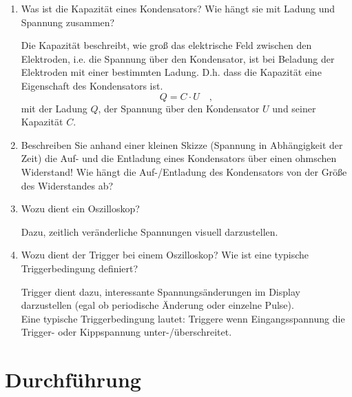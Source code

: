 \begin{enumerate}
\begin{solution}
		\end{solution}
 \item Was ist die Kapazität eines Kondensators? Wie hängt sie mit Ladung und Spannung zusammen?
		\begin{solution}
			Die Kapazität beschreibt, wie groß das elektrische Feld zwischen den Elektroden, i.e. die Spannung über den Kondensator, ist bei Beladung der Elektroden mit einer bestimmten Ladung. D.h. dass die Kapazität eine Eigenschaft des Kondensators ist.
			\begin{equation*}
				Q = C\cdot U\quad,
			\end{equation*}
			mit der Ladung $Q$, der Spannung über den Kondensator $U$ und seiner Kapazität $C$.
		\end{solution}
 \item Beschreiben Sie anhand einer kleinen Skizze (Spannung in Abhängigkeit der Zeit) die Auf- und die Entladung eines Kondensators über einen ohmschen Widerstand! Wie hängt die Auf-/Entladung des Kondensators von der Größe des Widerstandes ab?
 \item Wozu dient ein Oszilloskop?
	\begin{solution}
		Dazu, zeitlich veränderliche Spannungen visuell darzustellen.
	\end{solution}
 \item Wozu dient der Trigger bei einem Oszilloskop? Wie ist eine typische Triggerbedingung definiert?
	\begin{solution}
		Trigger dient dazu, interessante Spannungsänderungen im Display darzustellen (egal ob periodische Änderung oder einzelne Pulse). \\
		Eine typische Triggerbedingung lautet: Triggere wenn Eingangsspannung die Trigger- oder Kippspannung unter-/überschreitet.
	\end{solution}
\end{enumerate}

\section{Durchführung} 

